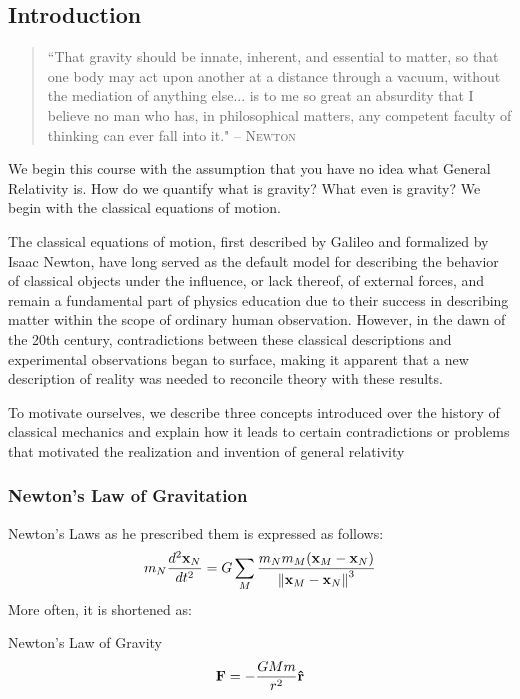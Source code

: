 
\subsection{Introduction}

	\begin{quote}
		\hspace{1em}``That gravity should be innate, inherent, and essential 
		to matter, so that one body may act upon another at a distance through
		a vacuum, without the mediation of anything else... is to me so great
		an absurdity that I believe no man who has, in philosophical matters,
		any competent faculty of thinking can ever fall into it."
		\hfill --  \textsc{Newton}
	\end{quote}
	We begin this course with the assumption that you have no idea what General Relativity is.
	How do we quantify what is gravity? What even is gravity? We begin with the classical equations of motion.

	The classical equations of motion, first described by Galileo and formalized by Isaac Newton, 
	have long served as the default model for describing the behavior of classical objects under 
	the influence, or lack thereof, of external forces, and remain a fundamental part of physics
	education due to their success in describing matter within the scope of ordinary human observation.
	However, in the dawn of the 20th century, contradictions between these classical descriptions
	and experimental observations began to surface, making it apparent that a new description of
	reality was needed to reconcile theory with these results.

	To motivate ourselves, we describe three concepts introduced over the history of classical mechanics and explain how 
	it leads to certain contradictions or problems that motivated the realization and invention of general relativity
	\newpage
	\subsubsection{Newton's Law of Gravitation}

		Newton's Laws as he prescribed them is expressed as follows:
		\begin{equation}
			m_N\dv[2]{\vb{x}_N}{t} 
			= 
			G \sum_M 
			\frac{
				m_N m_M (\vb{x}_M - \vb{x}_N)
			}{
				\norm{\vb{x}_M - \vb{x}_N}^3
			} 
		\end{equation}
		More often, it is shortened as:
		\begin{definition}{Newton's Law of Gravity}
			\begin{equation}
				\vb{F} = -\frac{GMm}{r^2}\vb{\hat{r}} 
			\end{equation}
		\end{definition}

